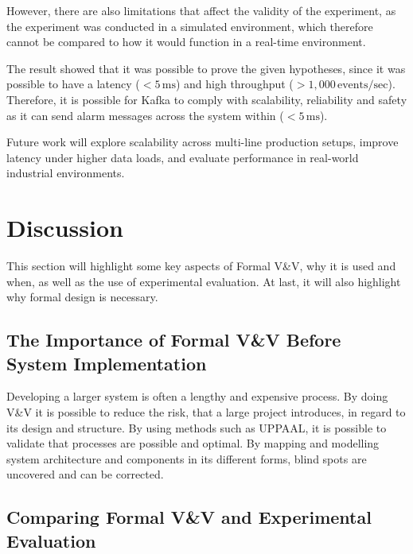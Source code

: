 However, there are also limitations that affect the validity of the experiment, as the experiment was conducted in a simulated environment, which therefore cannot be compared to how it would function in a real-time environment.

The result showed that it was possible to prove the given hypotheses, since it was possible to have a latency ($<5\,\text{ms}$) and high throughput ($>1{,}000\,\text{events/sec}$). Therefore, it is possible for Kafka to comply with scalability, reliability and safety as it can send alarm messages across the system within ($<5\,\text{ms}$).

Future work will explore scalability across multi-line production setups, improve latency under higher data loads, and evaluate performance in real-world industrial environments.




\section{Discussion}
\label{sec:discussion}

This section will highlight some key aspects of Formal V\&V, why it is used and when, as well as the use of experimental evaluation. At last, it will also highlight why formal design is necessary.

\subsection{The Importance of Formal V\&V Before System Implementation}

Developing a larger system is often a lengthy and expensive process. By doing V\&V it is possible to reduce the risk, that a large project introduces, in regard to its design and structure. 
By using methods such as UPPAAL, it is possible to validate that processes are possible and optimal. By mapping and modelling system architecture and components in its different forms, blind spots are uncovered and can be corrected.


\subsection{Comparing Formal V\&V and Experimental Evaluation}

